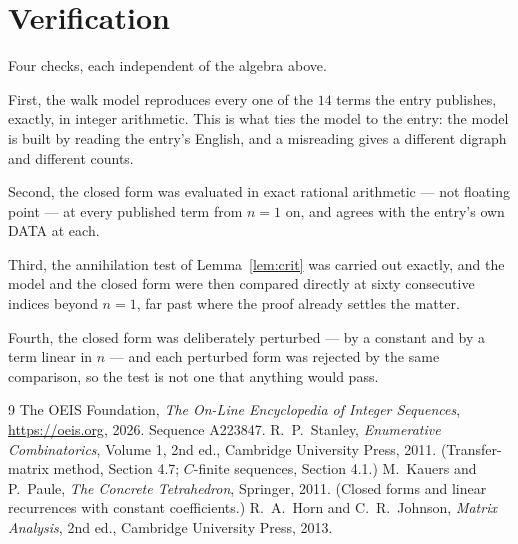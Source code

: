 \documentclass[11pt,a4paper]{article}
\theoremstyle{plain}
\theoremstyle{definition}
\begin{document}
\section{Verification}

Four checks, each independent of the algebra above.

First, the walk model reproduces every one of the $14$ terms the entry publishes,
exactly, in integer arithmetic. This is what ties the model to the entry: the model is built
by reading the entry's English, and a misreading gives a different digraph and different
counts.

Second, the closed form was evaluated in exact rational arithmetic --- not floating point ---
at every published term from $n=1$ on, and agrees with the entry's own DATA at each.

Third, the annihilation test of Lemma~\ref{lem:crit} was carried out exactly, and the model
and the closed form were then compared directly at sixty consecutive indices beyond
$n=1$, far past where the proof already settles the matter.

Fourth, the closed form was deliberately perturbed --- by a constant and by a term linear in
$n$ --- and each perturbed form was rejected by the same comparison, so the test is not one
that anything would pass.

\begin{thebibliography}{9}
 The OEIS Foundation, \emph{The On-Line Encyclopedia of Integer
Sequences}, \url{https://oeis.org}, 2026. Sequence A223847.
 R.~P.~Stanley, \emph{Enumerative Combinatorics}, Volume 1, 2nd ed.,
Cambridge University Press, 2011. (Transfer-matrix method, Section 4.7; $C$-finite sequences,
Section 4.1.)
 M.~Kauers and P.~Paule, \emph{The Concrete Tetrahedron}, Springer, 2011.
(Closed forms and linear recurrences with constant coefficients.)
 R.~A.~Horn and C.~R.~Johnson, \emph{Matrix Analysis}, 2nd ed., Cambridge
University Press, 2013.
\end{thebibliography}
\end{document}
